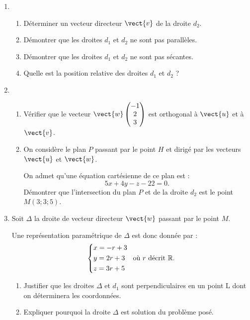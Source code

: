 \begin{enumerate}
	\item
	\begin{enumerate}
		\item Déterminer un vecteur directeur $\vect{v}$ de la droite $d_2$.
		\item Démontrer que les droites $d_1$ et $d_2$ ne sont pas parallèles.
		\item Démontrer que les droites $d_1$ et $d_2$  ne sont pas sécantes.
		\item Quelle est la position relative des droites $d_1$ et $d_2$ ?
	\end{enumerate}
	\item 
	\begin{enumerate}
		\item Vérifier que le vecteur $\vect{w}\begin{pmatrix}-1\\2\\3\end{pmatrix}$ est orthogonal à $\vect{u}$ et à $\vect{v}$.
		\item On considère le plan $P$ passant par le point $H$ et dirigé par les vecteurs $\vect{u}$ et $\vect{w}$.
		
		On admet qu'une équation cartésienne de ce plan est : \[5x + 4y - z - 22 = 0.\]
		Démontrer que l'intersection du plan $P$ et de la droite $d_2$ est le point $M(3;3;5)$.
	\end{enumerate}
	\item Soit $\Delta$ la droite de vecteur directeur $\vect{w}$ passant par le point $M$.
	
	Une représentation paramétrique de $\Delta$ est donc donnée par : \[ \begin{dcases}x=-r+3\\y=2r+3\\z=3r+5\end{dcases} \: \text{ où } r \text{ décrit } \mathbb{R}.\]
	\begin{enumerate}
		\item Justifier que les droites $\Delta$ et $d_1$ sont perpendiculaires en un point L dont on déterminera les coordonnées.
		\item Expliquer pourquoi la droite $\Delta$ est solution du problème posé.
	\end{enumerate}
\end{enumerate}
